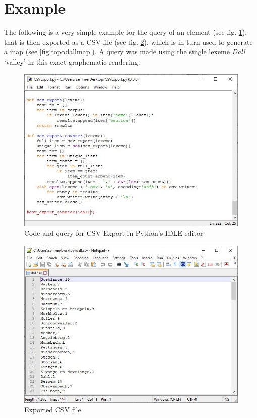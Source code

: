 \documentclass[10pt,a4paper]{article}
\begin{document}
\section*{Example}


The following is a very simple example for the query of an element (see fig. \ref{fig:topodallidle}), that is then exported as a CSV-file (see fig. \ref{fig:topodallcsv}), which is in turn used to generate a map (see \ref{fig:topodallmap}). A query was made using the single lexeme \emph{Dall} `valley' in this exact graphematic rendering.


\begin{figure}[h]
\includegraphics[width=\linewidth]{images/topo_dall_idle.jpg}
\centering
\caption{Code and query for CSV Export in Python's IDLE editor} \label{fig:topodallidle}
\end{figure}



\begin{figure}
\includegraphics[width=\linewidth]{images/topo_dall_csv.jpg}
\centering
\caption{Exported CSV file} \label{fig:topodallcsv}
\end{figure}
\end{document}
